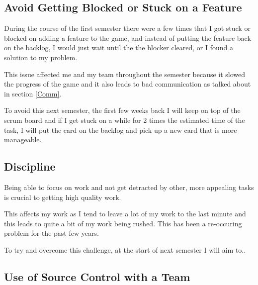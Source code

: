 \documentclass{scrartcl}
\begin{document}
\subsection{Avoid Getting Blocked or Stuck on a Feature} \label{Avoid}

During the course of the first semester there were a few times that I got stuck or blocked on adding a feature to the game, and instead of putting the feature back on the backlog, I would just wait until the the blocker cleared, or I found a solution to my problem.



This issue affected me and my team throughout the semester because it slowed the progress of the game and it also leads to bad communication as talked about in section \ref{Comm}.


To avoid this next semester, the first few weeks back I will keep on top of the scrum board and if I get stuck on a while for 2 times the estimated time of the task, I will put the card on the backlog and pick up a new card that is more manageable.

\par






\subsection{Discipline}

Being able to focus on work and not get detracted by other, more appealing tasks is crucial to getting high quality work.

This affects my work as I tend to leave a lot of my work to the last minute and this leads to quite a bit of my work being rushed.  
This has been a re-occuring problem for the past few years.

To try and overcome this challenge, at the start of next semester I will aim to.. %

\par




\subsection{Use of Source Control with a Team}
\end{document}
